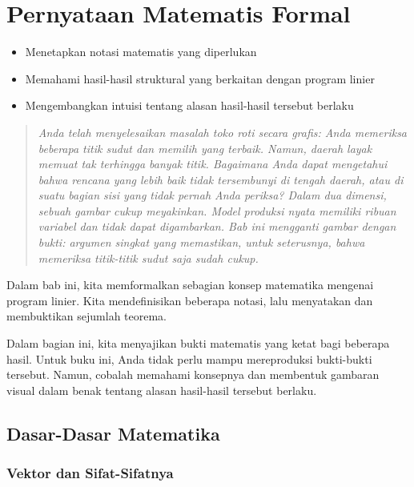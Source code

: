\chapter{Pernyataan Matematis Formal}
\begin{outcome}
\begin{itemize}
\item Menetapkan notasi matematis yang diperlukan
\item Memahami hasil-hasil struktural yang berkaitan dengan program linier
\item Mengembangkan intuisi tentang alasan hasil-hasil tersebut berlaku
\end{itemize}
\end{outcome}

\begin{quote}
\itshape Anda telah menyelesaikan masalah toko roti secara grafis: Anda memeriksa beberapa titik sudut dan memilih yang terbaik. Namun, daerah layak memuat tak terhingga banyak titik. Bagaimana Anda dapat \emph{mengetahui} bahwa rencana yang lebih baik tidak tersembunyi di tengah daerah, atau di suatu bagian sisi yang tidak pernah Anda periksa? Dalam dua dimensi, sebuah gambar cukup meyakinkan. Model produksi nyata memiliki ribuan variabel dan tidak dapat digambarkan. Bab ini mengganti gambar dengan bukti: argumen singkat yang memastikan, untuk seterusnya, bahwa memeriksa titik-titik sudut saja sudah cukup.
\end{quote}

Dalam bab ini, kita memformalkan sebagian konsep matematika mengenai program linier. Kita mendefinisikan beberapa notasi, lalu menyatakan dan membuktikan sejumlah teorema.

\begin{warn}
Dalam bagian ini, kita menyajikan bukti matematis yang ketat bagi beberapa hasil. Untuk buku ini, Anda tidak perlu mampu mereproduksi bukti-bukti tersebut. Namun, cobalah memahami konsepnya dan membentuk gambaran visual dalam benak tentang alasan hasil-hasil tersebut berlaku.
\end{warn}

\section{Dasar-Dasar Matematika}\label{sec:math-preliminaries}

\subsection{Vektor dan Sifat-Sifatnya}

